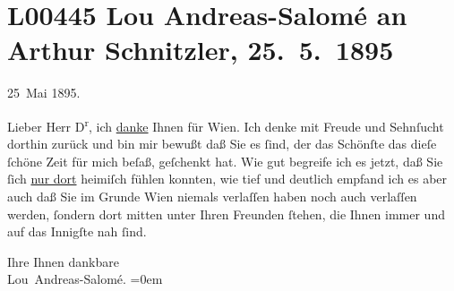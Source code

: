 

\section[Lou Andreas-Salomé an Arthur Schnitzler, 25. 5. 1895]{L00445 Lou Andreas-Salomé an Arthur Schnitzler, 25. 5. 1895}
\nopagebreak{}
\rehead{ }\normalsize\beginnumbering{}
\toendnotes[C]{\smallbreak\pagebreak[2]}
\pstart
           {\pb}25 Mai 1895.\pend
           
\pstart{}Lieber Herr D\textsuperscript{r},\pend\vspace{0.5em}
\pstart
           ich \uline{danke} Ihnen für Wien. Ich denke mit Freude und Sehnſucht dorthin zurück und bin mir bewußt
               daß Sie es ſind, der das Schönſte das dieſe ſchöne Zeit für mich beſaß, geſchenkt
               hat. Wie gut begreife ich es jetzt, daß Sie ſich \uline{nur
                  dort} heimiſch fühlen konnten, wie tief und deutlich empfand ich es aber auch
               daß Sie im Grunde Wien niemals verlaſſen haben
               noch auch verlaſſen werden, ſondern dort mitten {\pb}unter Ihren Freunden ſtehen, die Ihnen immer und auf das Innigſte nah ſind.\pend
           
\pstart
           Ihre Ihnen dankbare{\\[\baselineskip]}\spacefill\mbox{Lou Andreas-Salomé.}\pend
           \leftskip=0em{}\endnumbering{}  
      